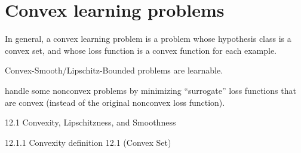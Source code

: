 \section{Convex learning problems}

In general, a convex learning problem is a problem whose hypothesis class is a
convex set, and whose loss function is a convex function for each example.

Convex-Smooth/Lipschitz-Bounded
problems are learnable.

handle some nonconvex problems
by minimizing “surrogate” loss functions that are convex (instead of the original
nonconvex loss function).

12.1 Convexity, Lipschitzness, and Smoothness

12.1.1 Convexity
definition 12.1 (Convex Set)
